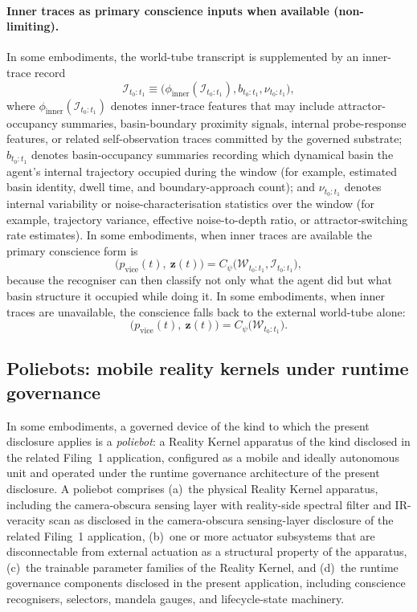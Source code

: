 \documentclass[a4paper,12pt]{article}
\newcommand{\RK}{Reality Kernel\xspace}
\begin{document}
\paragraph{Inner traces as primary conscience inputs when available (non-limiting).}
\label{sec:inner-traces-conscience}
In some embodiments, the world-tube transcript is supplemented by an
inner-trace record
\[
  \mathcal{I}_{t_0:t_1}
  \equiv
  \bigl(
    \phi_{\mathrm{inner}}(\mathcal{I}_{t_0:t_1}),
    b_{t_0:t_1},
    \nu_{t_0:t_1}
  \bigr),
\]
where $\phi_{\mathrm{inner}}(\mathcal{I}_{t_0:t_1})$ denotes
inner-trace features that may include attractor-occupancy
summaries, basin-boundary proximity signals, internal probe-response
features, or related self-observation traces committed by the governed
substrate; $b_{t_0:t_1}$ denotes basin-occupancy summaries recording
which dynamical basin the agent's internal trajectory occupied during
the window (for example, estimated basin identity, dwell time, and
boundary-approach count); and $\nu_{t_0:t_1}$ denotes internal
variability or noise-characterisation statistics over the window (for
example, trajectory variance, effective noise-to-depth ratio, or
attractor-switching rate estimates). In some embodiments, when inner traces are available the
primary conscience form is
\[
  \bigl(p_{\mathrm{vice}}(t),\ \mathbf{z}(t)\bigr)
  = C_\psi\!\bigl(\mathcal{W}_{t_0:t_1},\mathcal{I}_{t_0:t_1}\bigr),
\]
because the recogniser can then classify not only what the agent did
but what basin structure it occupied while doing it. In some
embodiments, when inner traces are unavailable, the conscience falls
back to the external world-tube alone:
\[
  \bigl(p_{\mathrm{vice}}(t),\ \mathbf{z}(t)\bigr)
  = C_\psi\!\bigl(\mathcal{W}_{t_0:t_1}\bigr).
\]
\subsection{Poliebots: mobile reality kernels under runtime governance}
\label{sec:poliebot}

In some embodiments, a governed device of the kind to which the
present disclosure applies is a \emph{poliebot}: a \RK
apparatus of the kind disclosed in the related Filing~1 application,
configured as a mobile and ideally autonomous unit and operated under
the runtime governance architecture of the present disclosure. A
poliebot comprises (a)~the physical \RK apparatus,
including the camera-obscura sensing layer with reality-side spectral
filter and IR-veracity scan as disclosed in the camera-obscura sensing-layer disclosure of the related Filing~1 application, (b)~one or more actuator subsystems that are
disconnectable from external actuation as a structural property of
the apparatus, (c)~the trainable parameter families of the \RK, and (d)~the runtime governance components disclosed in the
present application, including conscience recognisers, selectors,
mandela gauges, and lifecycle-state machinery.
\end{document}
